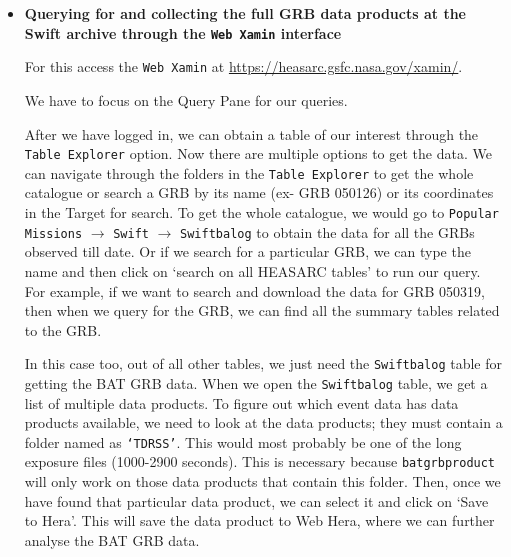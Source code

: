 \documentclass[prd,nofootinbib,preprintnumbers,floatfix]{revtex4}  %
\begin{document}
\begin{itemize}
\item {\bf Querying for and collecting the full GRB data products at the Swift archive through the {\tt Web Xamin} interface}

For this access the {\tt Web Xamin} at \url{https://heasarc.gsfc.nasa.gov/xamin/}. 

We have to focus on the Query Pane for our queries. 

\iffalse
\begin{figure}[h]
    \centering
    \texttt{[image: Plots/Dataprocessing/QuerypaneWebXamin.pdf]}
    \caption{Figure showing a sample query pane which is used to search and collect the data of a specific GRB or a list of GRBs.}
    \label{fig:web_xamin_query_pane}
\end{figure}
\fi


After we have logged in, we can obtain a table of our interest through the {\tt Table Explorer} option. Now there are multiple options to get the data.  We can navigate through the folders in the {\tt Table Explorer} to get the whole catalogue or search a GRB by its name (ex- GRB 050126) or its coordinates in the Target for search. To get the whole catalogue, we would go to {\tt Popular Missions} $\rightarrow$ {\tt Swift} $\rightarrow$ {\tt Swiftbalog} to obtain the data for all the GRBs observed till date. Or if we search for a particular GRB, we can type the name and then click on ‘search on all HEASARC tables’ to run our query. For example, if we want to  search and download the data for GRB 050319, then when we query for the GRB, we can find all the summary   tables related to the GRB. %

\iffalse
\begin{figure}[h]
    \centering
    \texttt{[image: Plots/Dataprocessing/Tableexplorer.pdf]}
    \caption{Figure showing table explorer which is used to select a particular table to proceed for our queried data. In our case, we will select the {\tt Swiftbalog} table.}
    \label{fig:table_explorer}
\end{figure}
\fi



In this case too, out of all other tables, we just need the {\tt Swiftbalog} table for getting the BAT GRB data. When we open the {\tt Swiftbalog} table, we get a list of multiple data products. To figure out which event data has data products available, we need to look at the data products; they must contain a folder named as {\tt ‘TDRSS’}. This would most probably be one of the long exposure files (1000-2900 seconds). This is necessary because {\tt batgrbproduct} will only work on those data products that contain this folder. Then, once we have found that particular data product, we can select it and click on ‘Save to Hera’. This will save the data product to Web Hera, where we can further analyse the BAT GRB data.


\end{itemize}
\end{document}
